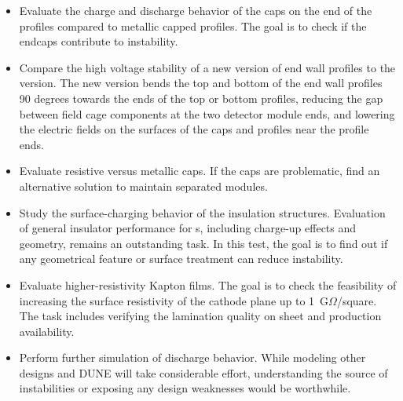 \begin{itemize}
\item Evaluate the charge and discharge behavior of the  caps on the end of the profiles compared to metallic capped profiles.  The goal is to check if the endcaps contribute to  instability. 
\item Compare the high voltage stability of a new version of end wall profiles to the  version.  The new version bends the top and bottom of the end wall profiles 90 degrees towards the ends of the top or bottom profiles, reducing the gap between field cage components at the two detector module ends, and lowering the electric fields on the surfaces of the  caps and profiles near the profile ends.
\item Evaluate resistive versus metallic caps.  If the  caps are %
problematic, find an alternative solution to maintain separated  modules.
\item Study the surface-charging behavior of the  insulation structures.  Evaluation of general insulator performance for \lartpc{}s, including charge-up effects and geometry, remains an outstanding task.  In this test, the goal is to find out if any geometrical feature or surface treatment can reduce  instability.
\item Evaluate higher-resistivity Kapton films.  The goal is to check the feasibility of increasing the surface resistivity of the cathode plane up to 1~G$\Omega$/square.  The task includes verifying the lamination quality on \frfour sheet and production availability.
\item Perform further simulation of   discharge behavior.   While modeling other  designs and DUNE will take considerable effort, %
understanding the source of instabilities or exposing any design weaknesses would be worthwhile. %
\end{itemize}

